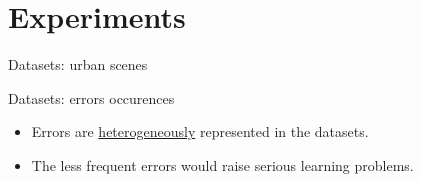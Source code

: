 \documentclass[10pt, export]{beamer}
\begin{document}
    \section{Experiments}
        \begin{frame}{Datasets: urban scenes}
            \begin{figure}
                \begin{center}
                    
                \end{center}
            \end{figure}
        \end{frame}
        \begin{frame}{Datasets: errors occurences}
            \begin{itemize}[label=$\blacktriangleright$, font=\color{IGNGreen}]
                \item<3-> \footnotesize Errors are \underline{heterogeneously} represented in the datasets.
                \item<4-> \footnotesize The less frequent errors would raise serious learning problems.
            \end{itemize}
        \end{frame}
\end{document}
